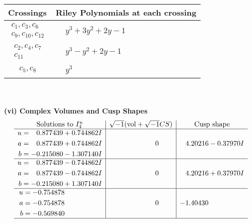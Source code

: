 \documentclass[1p]{elsarticle_modified}
\theoremstyle{definition}
\newcommand{\I}{\sqrt{-1}}
\begin{document}
\begin{tabular}{m{50pt}|m{274pt}}
Crossings & \hspace{64pt}Riley Polynomials at each crossing \\
\hline $$\begin{aligned}c_{1},c_{3},c_{6}\\c_{9},c_{10},c_{12}\end{aligned}$$&$\begin{aligned}
&y^3+3 y^2+2 y-1
\end{aligned}$\\
\hline $$\begin{aligned}c_{2},c_{4},c_{7}\\c_{11}\end{aligned}$$&$\begin{aligned}
&y^3- y^2+2 y-1
\end{aligned}$\\
\hline $$\begin{aligned}c_{5},c_{8}\end{aligned}$$&$\begin{aligned}
&y^3
\end{aligned}$\\
\hline
\end{tabular}\\~\\
\newpage\flushleft \textbf{(vi) Complex Volumes and Cusp Shapes}
$$\begin{array}{c|c|c}  
\text{Solutions to }I^u_{4}& \I (\text{vol} + \sqrt{-1}CS) & \text{Cusp shape}\\
 \hline 
\begin{aligned}
u &= \phantom{-}0.877439 + 0.744862 I \\
a &= \phantom{-}0.877439 + 0.744862 I \\
b &= -0.215080 - 1.307140 I\end{aligned}
 & \phantom{-0.000000 } 0 & \phantom{-}4.20216 - 0.37970 I \\ \hline\begin{aligned}
u &= \phantom{-}0.877439 - 0.744862 I \\
a &= \phantom{-}0.877439 - 0.744862 I \\
b &= -0.215080 + 1.307140 I\end{aligned}
 & \phantom{-0.000000 } 0 & \phantom{-}4.20216 + 0.37970 I \\ \hline\begin{aligned}
u &= -0.754878\phantom{ +0.000000I} \\
a &= -0.754878\phantom{ +0.000000I} \\
b &= -0.569840\phantom{ +0.000000I}\end{aligned}
 & \phantom{-0.000000 } 0 & -1.40430\phantom{ +0.000000I}\\
 \hline 
 \end{array}$$\newpage
\end{document}
